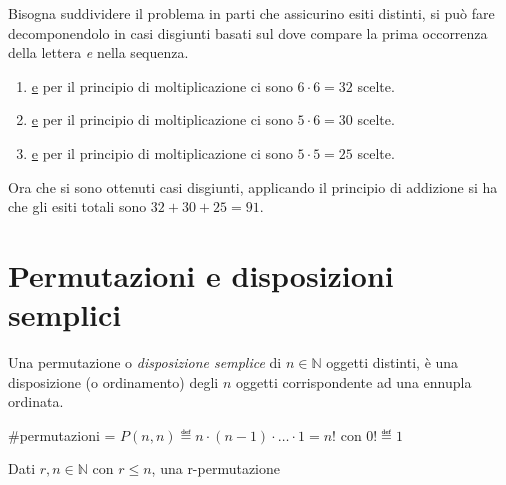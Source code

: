 \begin{ese}
\begin{enumerate}
		Bisogna suddividere il problema in parti che assicurino esiti distinti, si può fare
		decomponendolo in casi disgiunti basati sul dove compare la prima occorrenza della
		lettera \emph{e} nella sequenza.
		\begin{enumerate}
			\item \underline{e} \underline{ } \underline{ } \quad{ } per il principio di moltiplicazione
			ci sono $6 \cdot 6 = 32$ scelte.
			\item \underline{} \underline{e} \underline{ } \quad{ } per il principio di
			moltiplicazione ci sono $5 \cdot 6 = 30$ scelte. 
			\item \underline{} \underline{} \underline{e} \quad{} per il principio
			di moltiplicazione ci sono $5 \cdot 5 = 25$ scelte.
		\end{enumerate}
		Ora che si sono ottenuti casi disgiunti, applicando il principio di addizione si ha che
		gli esiti totali sono $32 + 30 + 25 = 91$.\QEDA
	\end{enumerate}
\end{ese}

\section{Permutazioni e disposizioni semplici}
\begin{defn}[Permutazione]
	Una permutazione o \emph{disposizione semplice} di $n \in \mathbb{N}$ oggetti distinti,
	è una disposizione (o ordinamento) degli $n$ oggetti corrispondente ad una ennupla ordinata.
	\begin{center}
		\centering
		\#{}permutazioni = $P(n,n) \eqdef n \cdot (n - 1) \cdot \ldots \cdot 1 = n!$ con $0! \eqdef 1$
	\end{center}
\end{defn}

\begin{defn}[r-permutazione]
	Dati $r, n \in \mathbb{N}$ con $r \leq n$, una r-permutazione %
\end{defn}
